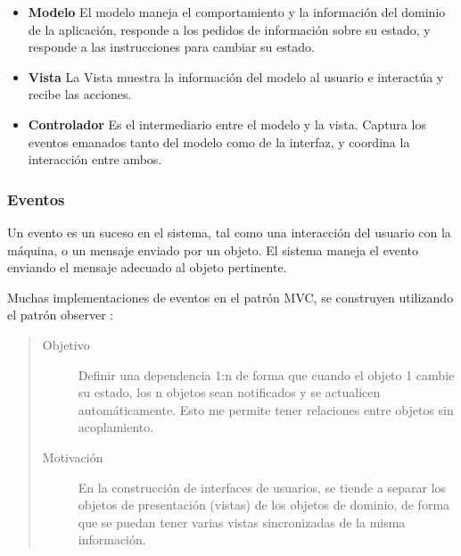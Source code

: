 	\begin {itemize}
	
		\item {\bf Modelo}
			El modelo maneja el comportamiento y la información del dominio de la
			aplicación, responde a los pedidos de información sobre su estado, 
			y responde a las instrucciones para cambiar su estado. 
			
			
		\item {\bf Vista}
			La Vista muestra la información del modelo al usuario e interactúa y recibe
			las acciones.
			
		\item {\bf Controlador}
			Es el intermediario entre el modelo y la vista.
			Captura los eventos emanados tanto del modelo como de la interfaz, y coordina
			la interacción entre ambos.
			
	
	\end {itemize}

\subsubsection{Eventos}
\label{sec:Eventos}

Un evento es un suceso en el sistema, tal como una interacción del usuario con
la máquina, o un mensaje enviado por un objeto.  
El sistema maneja el evento enviando el mensaje adecuado al objeto pertinente. 

Muchas implementaciones de eventos en el patrón MVC, se construyen utilizando el
patrón observer \cite{Gamma1995}:

\begin{quote}

\begin{description}
   
\item [Objetivo] Definir una dependencia 1:n de forma que cuando el objeto
	1 cambie su estado, los n objetos sean notificados y se actualicen
	automáticamente. Esto me permite tener relaciones entre objetos sin
	acoplamiento.

\item [Motivación] En la construcción de interfaces de usuarios, se tiende
	a separar los objetos de presentación (vistas) de los objetos de dominio, de
	forma que se puedan tener varias vistas sincronizadas de la misma información.

\end{description}
\end{quote}

